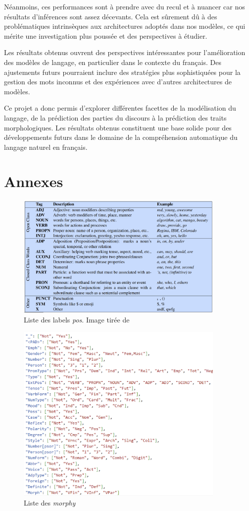 \documentclass[a4paper]{article}
\begin{document}
Néanmoins, ces performances sont à prendre avec du recul et à nuancer car nos résultats d'inférences sont assez décevants. Cela est sûrement dû à des problématiques intrinsèques aux architectures adoptés dans nos modèles, ce qui mérite une investigation plus poussée et des perspectives à étudier. 

Les résultats obtenus ouvrent des perspectives intéressantes pour l'amélioration des modèles de langage, en particulier dans le
contexte du français. Des ajustements futurs pourraient inclure des stratégies plus sophistiquées pour la gestion des mots
inconnus et des expériences avec d'autres architectures de modèles.

Ce projet a donc permis d'explorer différentes facettes de la modélisation du langage, de la prédiction des parties du discours à
la prédiction des traits morphologiques. Les résultats obtenus constituent une base solide pour des développements futurs dans le
domaine de la compréhension automatique du langage naturel en français.

\newpage

\section{Annexes}
\label{sec: Annexes}

\begin{figure}[H]
    \centering
    \includegraphics[width=0.9\textwidth]{all_pos.png}
    \caption{Liste des labels \textit{pos}. Image tirée de~\cite{pos}}
    \label{fig: all pos}
\end{figure}   

\begin{figure}[H]
    \centering
    \includegraphics[width=0.9\textwidth]{all_morphy.png}
    \caption{Liste des \textit{morphy}}
    \label{fig: all morphy}
\end{figure}  

\newpage

\printbibliography
\end{document}
